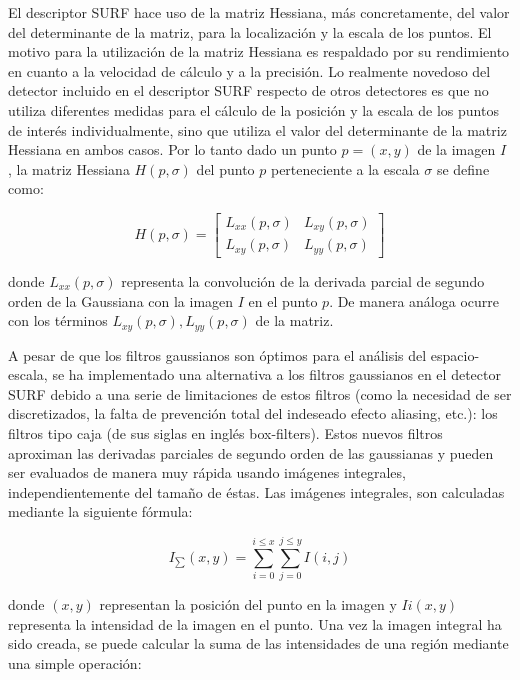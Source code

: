 El descriptor SURF hace uso de la matriz Hessiana, más concretamente, del valor del determinante de la matriz, para la localización y la escala de los puntos. El motivo para la utilización de la matriz Hessiana es respaldado por su rendimiento en cuanto a la velocidad de cálculo y a la precisión. Lo realmente novedoso del detector incluido en el descriptor SURF respecto de otros detectores es que no utiliza diferentes medidas para el cálculo de la posición y la escala de los puntos de interés individualmente, sino que utiliza el valor del determinante de la matriz Hessiana en ambos casos. Por lo tanto dado un punto $p = (x, y)$ de la imagen $I$ , la matriz Hessiana $H (p, \sigma)$ del punto $p$ perteneciente a la escala $\sigma$ se define como:

\begin{equation}
  H (p, \sigma) = 
  \begin{bmatrix}
    L_{xx} (p, \sigma) & L_{xy} (p, \sigma)  \\ 
    L_{xy} (p, \sigma) & L_{yy} (p, \sigma)
  \end{bmatrix}
\end{equation}

donde $L_{xx} (p, \sigma)$ representa la convolución de la derivada parcial de segundo orden de la Gaussiana con la imagen $I$ en el punto $p$. De manera análoga ocurre con los términos $L_{xy} (p, \sigma), L_{yy} (p, \sigma)$ de la matriz. 

A pesar de que los filtros gaussianos son óptimos para el análisis del espacio-escala, se ha implementado una alternativa a los filtros gaussianos en el detector SURF debido a una serie de limitaciones de estos filtros (como la necesidad de ser discretizados, la falta de prevención total del indeseado efecto aliasing, etc.): los filtros tipo caja (de sus siglas en inglés box-filters). Estos nuevos
filtros aproximan las derivadas parciales de segundo orden de las gaussianas y pueden ser evaluados de manera muy rápida usando imágenes integrales, independientemente del tamaño de éstas. Las imágenes integrales, son calculadas mediante la siguiente fórmula:

\begin{equation}
  I_{\sum}(x,y) = \sum_{i=0}^{i\leq x} \sum_{j=0}^{j\leq y} I(i,j)
\end{equation}

donde $(x, y)$ representan la posición del punto en la imagen y $Ii (x, y)$representa la intensidad de la imagen en el punto. Una vez la imagen integral ha sido creada, se puede calcular la suma de las intensidades de una región mediante una simple operación:

